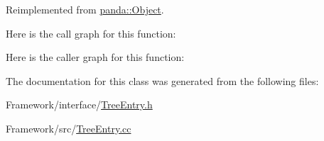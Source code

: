 Reimplemented from \hyperlink{classpanda_1_1Object_a282e820b1ad431db22ca4d4dd20b55e0}{panda::Object}.

Here is the call graph for this function:

Here is the caller graph for this function:

The documentation for this class was generated from the following files:\begin{DoxyCompactItemize}
\item 
Framework/interface/\hyperlink{TreeEntry_8h}{TreeEntry.h}\item 
Framework/src/\hyperlink{TreeEntry_8cc}{TreeEntry.cc}\end{DoxyCompactItemize}

